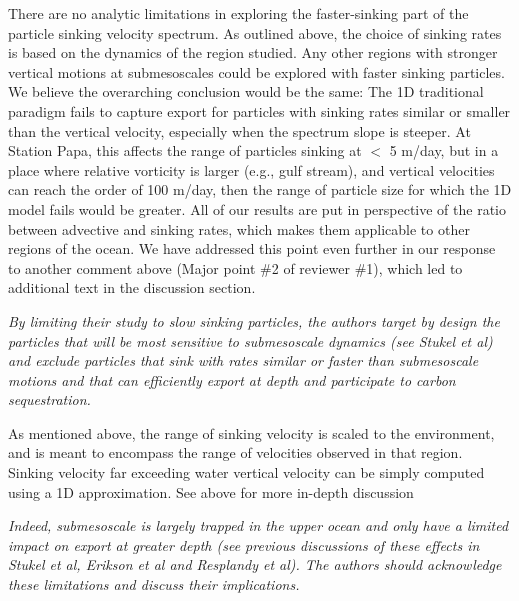 \documentclass[12pt,letter]{article}
\begin{document}
{\color{blue}
	There are no analytic limitations in exploring the faster-sinking part of the particle sinking velocity spectrum. As outlined above, the choice of sinking rates is based on the dynamics of the region studied. Any other regions with stronger vertical motions at submesoscales could be explored with faster sinking particles. We believe the overarching conclusion would be the same: The 1D traditional paradigm fails to capture export for particles with sinking rates similar or smaller than the vertical velocity, especially when the spectrum slope is steeper. At Station Papa, this affects the range of particles sinking at $<$ 5 m/day, but in a place where relative vorticity is larger (e.g., gulf stream), and vertical velocities can reach the order of 100 m/day, then the range of particle size for which the 1D model fails would be greater. All of our results are put in perspective of the ratio between advective and sinking rates, which makes them applicable to other regions of the ocean. We have addressed this point even further in our response to another comment above (Major point \#2 of reviewer \#1), which led to additional text in the discussion section.\\}

\textit{By limiting their study to slow sinking particles, the authors target by design the particles that will be most sensitive to submesoscale dynamics (see Stukel et al) and exclude particles that sink with rates similar or faster than submesoscale motions and that can efficiently export at depth and participate to carbon sequestration.}

{\color{blue}
	As mentioned above, the range of sinking velocity is scaled to the environment, and is meant to encompass the range of velocities observed in that region. Sinking velocity far exceeding water vertical velocity can be simply computed using a 1D approximation. See above for more in-depth discussion\\}

 \textit{Indeed, submesoscale is largely trapped in the upper ocean and only have a limited impact on export at greater depth (see previous discussions of these effects in Stukel et al, Erikson et al and Resplandy et al). The authors should acknowledge these limitations and discuss their implications.\\}
\end{document}
